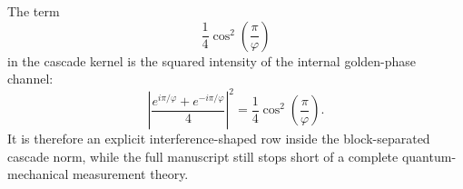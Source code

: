 \begin{corollary}
\label{cor:zeckendorf-cosine-term-interference-shadow}
The term
$$
  \frac14\cos^2\left(\frac{\pi}{\varphi}\right)
$$
in the cascade kernel is the squared intensity of the internal
golden-phase channel:
$$
  \left|
    \frac{
      e^{i\pi/\varphi}
      +
      e^{-i\pi/\varphi}
    }{4}
  \right|^2
  =
  \frac14\cos^2\left(\frac{\pi}{\varphi}\right).
$$
It is therefore an explicit interference-shaped row inside the
block-separated cascade norm, while the full manuscript still stops
short of a complete quantum-mechanical measurement theory.
\end{corollary}
